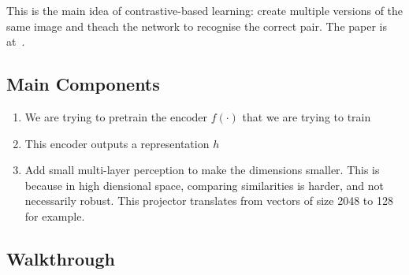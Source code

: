 \documentclass[11pt]{article}
\begin{document}
This is the main idea of contrastive-based learning: create multiple versions of the same image and theach the network to recognise the correct pair. The paper is at~\cite{chen2020simple}.

\subsection{Main Components}

\begin{figure}[H]
    \centering
\end{figure}

\begin{enumerate}
    \item We are trying to pretrain the encoder $f(\cdot)$ that we are trying to train
    \item This encoder outputs a representation $h$ 
    \item Add small multi-layer perception to make the dimensions smaller. This is because in high diensional space, comparing similarities is harder, and not necessarily robust. This projector translates from vectors of size 2048 to 128 for example.
\end{enumerate}

\subsection{Walkthrough}
\end{document}
